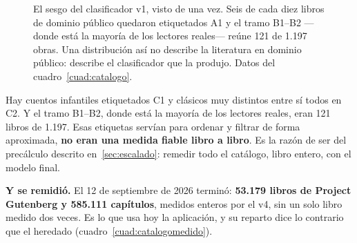 \documentclass[11pt,a4paper]{article}
\begin{document}
\begin{figure}[htbp]
\centering
{}
\caption[Reparto de niveles del catálogo heredado]{El sesgo del clasificador v1, visto de
una vez. Seis de cada diez libros de dominio público quedaron etiquetados A1 y el tramo
B1--B2 —donde está la mayoría de los lectores reales— reúne 121 de 1.197 obras. Una
distribución así no describe la literatura en dominio público: describe el clasificador
que la produjo. Datos del cuadro~\ref{cuad:catalogo}.}
\label{fig:catalogo}
\end{figure}

Hay cuentos infantiles etiquetados C1 y clásicos muy distintos entre sí todos en C2. Y
el tramo B1--B2, donde está la mayoría de los lectores reales, eran 121 libros de 1.197.
Esas etiquetas servían para ordenar y filtrar de forma aproximada, \textbf{no eran una
medida fiable libro a libro}. Es la razón de ser del precálculo descrito
en~\ref{sec:escalado}: remedir todo el catálogo, libro entero, con el modelo final.

\textbf{Y se remidió.} El 12 de septiembre de 2026 terminó: \textbf{53.179 libros de
Project Gutenberg y 585.111 capítulos}, medidos enteros por el v4, sin un solo libro medido
dos veces. Es lo que usa hoy la aplicación, y su reparto dice lo contrario que el heredado
(cuadro~\ref{cuad:catalogomedido}).
\end{document}
